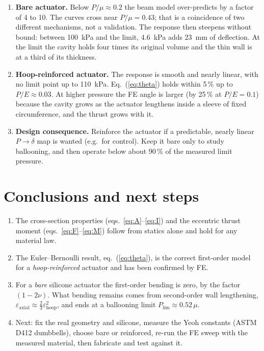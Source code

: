 \documentclass[11pt,a4paper]{article}
\numberwithin{equation}{section}
\begin{document}
\begin{enumerate}[nosep]
\item \textbf{Bare actuator.} Below $P/\mu\approx0.2$ the beam model over-predicts by a factor of 4 to 10. The curves cross near $P/\mu=0.43$; that is a coincidence of two different mechanisms, not a validation. The response then steepens without bound: between \SI{100}{kPa} and the limit, \SI{4.6}{kPa} adds \SI{23}{mm} of deflection. At the limit the cavity holds four times its original volume and the thin wall is at a third of its thickness.
\item \textbf{Hoop-reinforced actuator.} The response is smooth and nearly linear, with no limit point up to \SI{110}{kPa}. Eq.~(\ref{eq:theta}) holds within 5\,\% up to $P/E\approx0.03$. At higher pressure the FE angle is larger (by 25\,\% at $P/E=0.1$) because the cavity grows as the actuator lengthens inside a sleeve of fixed circumference, and the thrust grows with it.
\item \textbf{Design consequence.} Reinforce the actuator if a predictable, nearly linear $P\to\delta$ map is wanted (e.g.\ for control). Keep it bare only to study ballooning, and then operate below about 90\,\% of the measured limit pressure.
\end{enumerate}

\section{Conclusions and next steps}
\begin{enumerate}[nosep]
\item The cross-section properties (eqs.~\ref{eq:A}--\ref{eq:I}) and the eccentric thrust moment (eqs.~\ref{eq:F}--\ref{eq:M}) follow from statics alone and hold for any material law.
\item The Euler--Bernoulli result, eq.~(\ref{eq:theta}), is the correct first-order model for a \emph{hoop-reinforced} actuator and has been confirmed by FE.
\item For a \emph{bare} silicone actuator the first-order bending is zero, by the factor $(1-2\nu)$. What bending remains comes from second-order wall lengthening, $\varepsilon_{\text{axial}}\approx\frac23\varepsilon_{\text{hoop}}^2$, and ends at a ballooning limit $P_{\text{lim}}\approx0.52\,\mu$.
\item Next: fix the real geometry and silicone, measure the Yeoh constants (ASTM D412 dumbbells), choose bare or reinforced, re-run the FE sweep with the measured material, then fabricate and test against it.
\end{enumerate}
\end{document}
